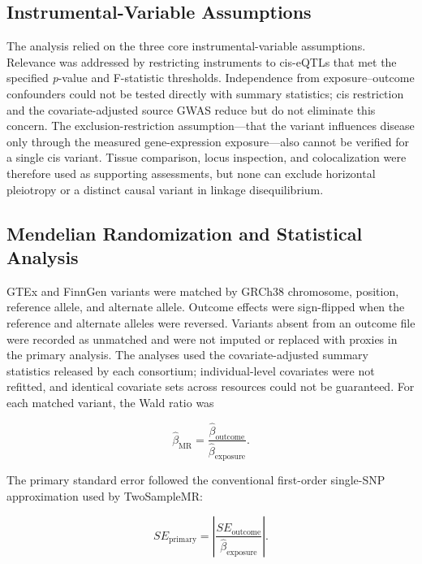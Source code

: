 \subsection*{Instrumental-Variable Assumptions}

The analysis relied on the three core instrumental-variable assumptions. Relevance was addressed by restricting instruments to cis-eQTLs that met the specified \textit{p}-value and F-statistic thresholds. Independence from exposure--outcome confounders could not be tested directly with summary statistics; cis restriction and the covariate-adjusted source GWAS reduce but do not eliminate this concern. The exclusion-restriction assumption---that the variant influences disease only through the measured gene-expression exposure---also cannot be verified for a single cis variant. Tissue comparison, locus inspection, and colocalization were therefore used as supporting assessments, but none can exclude horizontal pleiotropy or a distinct causal variant in linkage disequilibrium.

\subsection*{Mendelian Randomization and Statistical Analysis}

GTEx and FinnGen variants were matched by GRCh38 chromosome, position, reference allele, and alternate allele. Outcome effects were sign-flipped when the reference and alternate alleles were reversed. Variants absent from an outcome file were recorded as unmatched and were not imputed or replaced with proxies in the primary analysis. The analyses used the covariate-adjusted summary statistics released by each consortium; individual-level covariates were not refitted, and identical covariate sets across resources could not be guaranteed. For each matched variant, the Wald ratio was

\begin{equation}
\hat{\beta}_{\mathrm{MR}} =
\frac{\hat{\beta}_{\mathrm{outcome}}}{\hat{\beta}_{\mathrm{exposure}}}.
\label{eq:wald}
\end{equation}

The primary standard error followed the conventional first-order single-SNP approximation used by TwoSampleMR:

\begin{equation}
SE_{\mathrm{primary}} =
\left|\frac{SE_{\mathrm{outcome}}}{\hat{\beta}_{\mathrm{exposure}}}\right|.
\label{eq:se-primary}
\end{equation}

